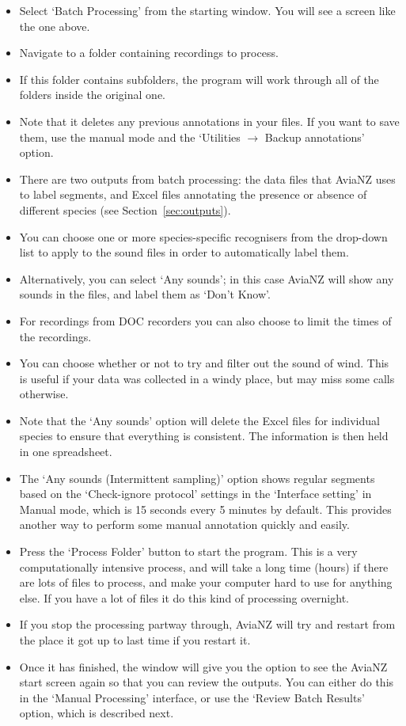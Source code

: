 \documentclass{article}
\begin{document}
\begin{itemize}
\item Select `Batch Processing' from the starting window. You will see a screen like the one above. 
\item Navigate to a folder containing recordings to process. 
\item If this folder contains subfolders, the program will work through all of the folders inside the original one. 
\item Note that it deletes any previous annotations in your files. If you want to save them, use the manual mode and the `Utilities $\rightarrow$ Backup annotations' option.
\item There are two outputs from batch processing: the data files that AviaNZ uses to label segments, and Excel files annotating the presence or absence of different species (see Section~\ref{sec:outputs}).
\item You can choose one or more species-specific recognisers from the drop-down list to apply to the sound files in order to automatically label them. 
\item Alternatively, you can select `Any sounds'; in this case AviaNZ will show any sounds in the files, and label them as `Don't Know'. 
\item For recordings from DOC recorders you can also choose to limit the times of the recordings. 
\item You can choose whether or not to try and filter out the sound of wind. This is useful if your data was collected in a windy place, but may miss some calls otherwise. 
\item Note that the `Any sounds' option will delete the Excel files for individual species to ensure that everything is consistent. The information is then held in one spreadsheet.  
\item The `Any sounds (Intermittent sampling)' option shows regular segments based on the `Check-ignore protocol' settings in the `Interface setting' in Manual mode, which is 15 seconds every 5 minutes by default. This provides another way to perform some manual annotation quickly and easily.
\item Press the `Process Folder' button to start the program. This is a very computationally intensive process, and will take a long time (hours) if there are lots of files to process, and make your computer hard to use for anything else. If you have a lot of files it do this kind of processing overnight. 
\item If you stop the processing partway through, AviaNZ will try and restart from the place it got up to last time if you restart it.
\item Once it has finished, the window will give you the option to see the AviaNZ start screen again so that you can review the outputs. You can either do this in the `Manual Processing' interface, or use the `Review Batch Results' option, which is described next. 
\end{itemize}
\end{document}
